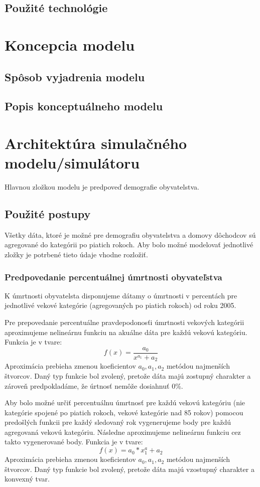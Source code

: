\documentclass[a4paper, 11pt]{article}
\begin{document}
\subsection{Použité technológie}



\section{Koncepcia modelu}
\subsection{Spôsob vyjadrenia modelu}
\subsection{Popis konceptuálneho modelu}


\section{Architektúra simulačného modelu/simulátoru}
Hlavnou zložkou modelu je predpoveď demografie obyvatelstva.

\subsection{Použité postupy}
Všetky dáta, ktoré je možné pre demografiu obyvatelstva a domovy dôchodcov sú agregované do kategórii po piatich rokoch. Aby bolo možné modelovať jednotlivé zložky je potrbené tieto údaje vhodne rozložiť.

\subsubsection*{Predpovedanie percentuálnej úmrtnosti obyvateľstva}
K úmrtnosti obyvatelsta disponujeme dátamy o úmrtnosti v percentách pre jednotlivé vekové kategórie (agregovaných po piatich rokoch) od roku 2005.

Pre prepovedanie percentuálne pravdepodonosťi úmrtnosti vekových kategórii aproximujeme nelineárnu funkciu na akuálne dáta pre každú vekovú kategóriu. Funkcia je v tvare:
$$f(x)=\frac{a_0}{x^{a_1} + a_2}$$
Aproximácia prebieha zmenou koeficientov $a_0, a_1, a_2$ metódou najmenších štvorcov. Daný typ funkcie bol zvolený, pretože dáta majú zostupný charakter a zároveň predpokladáme, že úrtnosť nemôže dosiahnuť 0\%.

Aby bolo možné určiť percentuálnu úmrtnosť pre každú vekovú kategóriu (nie kategórie spojené po piatich rokoch, vekové kategórie nad 85 rokov) pomocou predošlých funkcii pre každý sledovaný rok vygenerujeme body pre každú agregovaná vekovú kategóriu. Následne aproximujeme nelineárnu funkciu cez takto vygenerované body. Funkcia je v tvare:
$$f(x) = a_0 * x^a_1 + a_2$$
Aproximácia prebieha zmenou koeficientov $a_0, a_1, a_2$ metódou najmenších štvorcov. Daný typ funkcie bol zvolený, pretože dáta majú vzostupný charakter a konvexný tvar.
\end{document}
